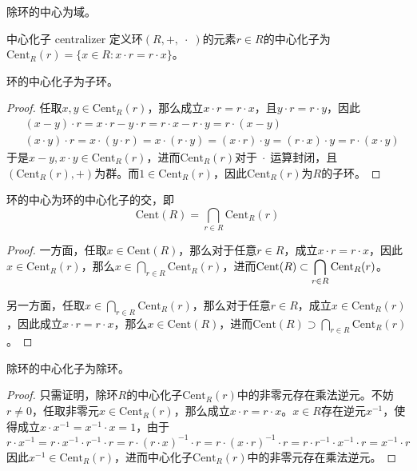 \begin{proposition}
	除环的中心为域。
\end{proposition}

\begin{definition}{中心化子 centralizer}
	定义环$(R,+,\;\cdot\;)$的元素$r\in R$的中心化子为$\mathrm{Cent}_R(r)=\{ x\in R:x\cdot r=r\cdot x \}$。
\end{definition}

\begin{proposition}
	环的中心化子为子环。
\end{proposition}

\begin{proof}
	任取$x,y\in\mathrm{Cent}_R(r)$，那么成立$x\cdot r=r\cdot x$，且$y\cdot r=r\cdot y$，因此
	\begin{align*}
		&(x-y)\cdot r=x\cdot r-y\cdot r=r\cdot x-r\cdot y=r\cdot (x-y)\\
		&(x\cdot y)\cdot r=x\cdot (y\cdot r)=x\cdot (r\cdot y)=(x\cdot r)\cdot y=(r\cdot x)\cdot y=r\cdot (x\cdot y)
	\end{align*}
	于是$x-y,x\cdot y\in\mathrm{Cent}_R(r)$，进而$\mathrm{Cent}_R(r)$对于$\;\cdot\;$运算封闭，且$(\mathrm{Cent}_R(r),+)$为群。而$1\in \mathrm{Cent}_R(r)$，因此$\mathrm{Cent}_R(r)$为$R$的子环。
\end{proof}

\begin{proposition}
	环的中心为环的中心化子的交，即
	$$
	\mathrm{Cent}(R)=\bigcap_{r\in R}\mathrm{Cent}_R(r)
	$$
\end{proposition}

\begin{proof}
	一方面，任取$x\in\mathrm{Cent}(R)$，那么对于任意$r\in R$，成立$x\cdot r=r\cdot x$，因此$x\in \mathrm{Cent}_R(r)$，那么$\displaystyle x\in\bigcap_{r\in R}\mathrm{Cent}_R(r)$，进而$\displaystyle \mathrm{Cent}(R)\subset\bigcap_{r\in R}\mathrm{Cent}_R(r)$。
	
	另一方面，任取$\displaystyle x\in\bigcap_{r\in R}\mathrm{Cent}_R(r)$，那么对于任意$r\in R$，成立$x\in\mathrm{Cent}_R(r)$，因此成立$x\cdot r=r\cdot x$，那么$x\in\mathrm{Cent}(R)$，进而$\displaystyle \mathrm{Cent}(R)\supset\bigcap_{r\in R}\mathrm{Cent}_R(r)$。
\end{proof}

\begin{proposition}
	除环的中心化子为除环。
\end{proposition}

\begin{proof}
	只需证明，除环$R$的中心化子$\mathrm{Cent}_R(r)$中的非零元存在乘法逆元。不妨$r\ne0$，任取非零元$x\in\mathrm{Cent}_R(r)$，那么成立$x\cdot r=r\cdot x$。$x\in R$存在逆元$x^{-1}$，使得成立$x\cdot x^{-1}=x^{-1}\cdot x=1$，由于
	$$
	r\cdot x^{-1}=r\cdot x^{-1}\cdot r^{-1}\cdot r=r\cdot (r\cdot x)^{-1}\cdot r=r\cdot (x\cdot r)^{-1}\cdot r=r\cdot r^{-1}\cdot x^{-1}\cdot r=x^{-1}\cdot r
	$$
	因此$x^{-1}\in\mathrm{Cent}_R(r)$，进而中心化子$\mathrm{Cent}_R(r)$中的非零元存在乘法逆元。
\end{proof}

